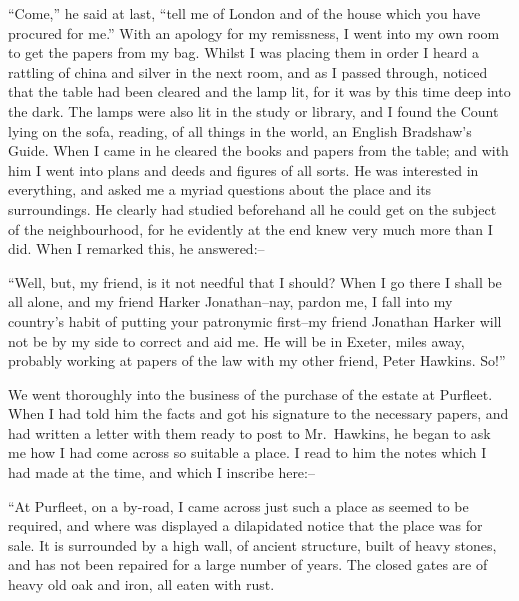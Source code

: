 \documentclass[12pt,openright]{book}
\begin{document}
“Come,” he said at last, “tell me of London and of the house which you have procured for me.” With an apology for my remissness, I went into my own room to get the papers from my bag. Whilst I was placing them in order I heard a rattling of china and silver in the next room, and as I passed through, noticed that the table had been cleared and the lamp lit, for it was by this time deep into the dark. The lamps were also lit in the study or library, and I found the Count lying on the sofa, reading, of all things in the world, an English Bradshaw’s Guide. When I came in he cleared the books and papers from the table; and with him I went into plans and deeds and figures of all sorts. He was interested in everything, and asked me a myriad questions about the place and its surroundings. He clearly had studied beforehand all he could get on the subject of the neighbourhood, for he evidently at the end knew very much more than I did. When I remarked this, he answered:–

“Well, but, my friend, is it not needful that I should? When I go there I shall be all alone, and my friend Harker Jonathan–nay, pardon me, I fall into my country’s habit of putting your patronymic first–my friend Jonathan Harker will not be by my side to correct and aid me. He will be in Exeter, miles away, probably working at papers of the law with my other friend, Peter Hawkins. So!”

We went thoroughly into the business of the purchase of the estate at Purfleet. When I had told him the facts and got his signature to the necessary papers, and had written a letter with them ready to post to Mr. Hawkins, he began to ask me how I had come across so suitable a place. I read to him the notes which I had made at the time, and which I inscribe here:–

“At Purfleet, on a by-road, I came across just such a place as seemed to be required, and where was displayed a dilapidated notice that the place was for sale. It is surrounded by a high wall, of ancient structure, built of heavy stones, and has not been repaired for a large number of years. The closed gates are of heavy old oak and iron, all eaten with rust.
\end{document}
